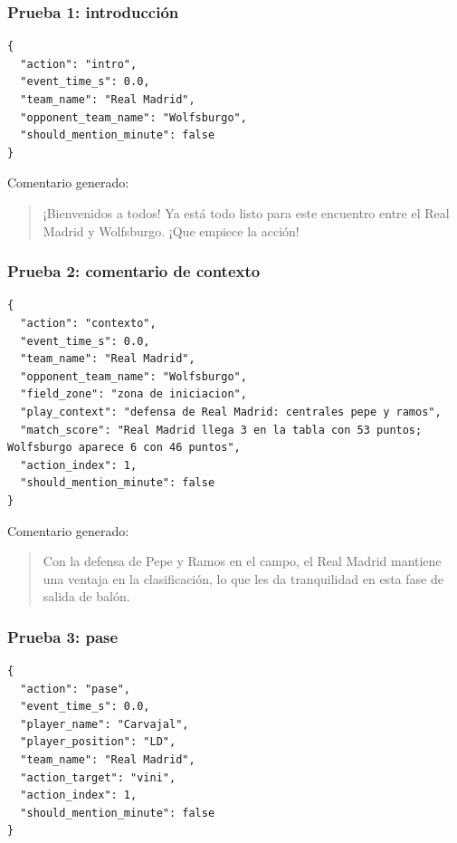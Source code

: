 \subsubsection*{Prueba 1: introducción}

\begin{verbatim}
{
  "action": "intro",
  "event_time_s": 0.0,
  "team_name": "Real Madrid",
  "opponent_team_name": "Wolfsburgo",
  "should_mention_minute": false
}
\end{verbatim}

Comentario generado:

\begin{quote}
¡Bienvenidos a todos! Ya está todo listo para este encuentro entre el Real Madrid y Wolfsburgo. ¡Que empiece la acción!
\end{quote}

\subsubsection*{Prueba 2: comentario de contexto}

\begin{verbatim}
{
  "action": "contexto",
  "event_time_s": 0.0,
  "team_name": "Real Madrid",
  "opponent_team_name": "Wolfsburgo",
  "field_zone": "zona de iniciacion",
  "play_context": "defensa de Real Madrid: centrales pepe y ramos",
  "match_score": "Real Madrid llega 3 en la tabla con 53 puntos; Wolfsburgo aparece 6 con 46 puntos",
  "action_index": 1,
  "should_mention_minute": false
}
\end{verbatim}

Comentario generado:

\begin{quote}
Con la defensa de Pepe y Ramos en el campo, el Real Madrid mantiene una ventaja en la clasificación, lo que les da tranquilidad en esta fase de salida de balón.
\end{quote}

\subsubsection*{Prueba 3: pase}

\begin{verbatim}
{
  "action": "pase",
  "event_time_s": 0.0,
  "player_name": "Carvajal",
  "player_position": "LD",
  "team_name": "Real Madrid",
  "action_target": "vini",
  "action_index": 1,
  "should_mention_minute": false
}
\end{verbatim}

